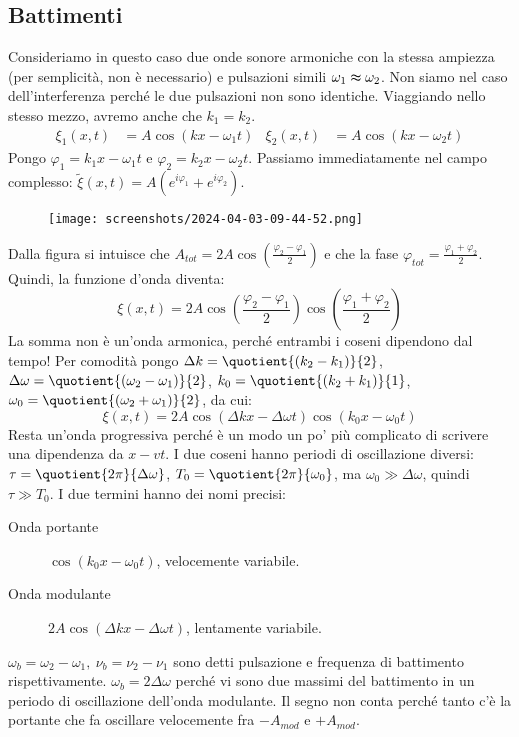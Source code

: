 \subsection{Battimenti}
Consideriamo in questo caso due onde sonore armoniche con la stessa ampiezza (per semplicità, non è necessario) e pulsazioni simili \(\omega _1 \thickapprox  \omega _2\). Non siamo nel caso dell'interferenza perché le due pulsazioni non sono identiche. Viaggiando nello stesso mezzo, avremo anche che \(k_1 = k_2\).
\begin{align}
	\xi _1 (x,t) &= A \cos (kx - \omega _1 t) & \xi _2 (x,t) &= A \cos (kx - \omega _2 t)
\end{align}
Pongo \(\varphi _1 = k_1 x - \omega_1 t\) e \(\varphi _2 = k_2 x - \omega _2 t\). Passiamo immediatamente nel campo complesso: \(\widetilde{\xi } (x,t) = A (e^{i \varphi _1} + e^{i \varphi _2}) \).
\begin{figure}[H]
	\centering
	\texttt{[image: screenshots/2024-04-03-09-44-52.png]}
\end{figure}
Dalla figura si intuisce che \(A_{tot} = 2A \cos \left( \frac{\varphi _2 - \varphi _1}{2} \right) \) e che la fase \(\varphi _{tot} = \frac{\varphi _1 + \varphi _2}{2} \). Quindi, la funzione d'onda diventa:
\[
	\xi (x,t) = 2A \cos \left( \frac{\varphi _2 - \varphi _1}{2} \right) \cos \left( \frac{\varphi _1 + \varphi _2}{2} \right) 
\]
La somma non è un'onda armonica, perché entrambi i coseni dipendono dal tempo! Per comodità pongo \(\Delta k = \quotient{(k_2 - k_1)}{2} \), \(\Delta \omega = \quotient{(\omega _2 - \omega _1)}{2} \), \(k_0 = \quotient{(k_2 + k_1)}{1} \), \(\omega _0 = \quotient{(\omega _2 + \omega _1 )}{2} \), da cui:
\[
	\xi (x,t) = 2A \cos (\Delta k x - \Delta \omega t) \cos (k_0 x - \omega _0 t)
\]
Resta un'onda progressiva perché è un modo un po' più complicato di scrivere una dipendenza da \(x-vt\). I due coseni hanno periodi di oscillazione diversi: \(\tau = \quotient{2\pi}{\Delta \omega } \), \(T_0 = \quotient{2 \pi }{\omega _0} \), ma \(\omega _0 \gg \Delta \omega \), quindi \(\tau \gg T_0\).
I due termini hanno dei nomi precisi:
\begin{description}
	\item[Onda portante] \(\cos (k_0 x - \omega _0 t)\), velocemente variabile.
	\item[Onda modulante] \(2A \cos (\Delta k x - \Delta \omega t)\), lentamente variabile.
\end{description}
\(\omega _b = \omega _2 - \omega _1,\ \nu _b = \nu _2 - \nu _1\) sono detti pulsazione e frequenza di battimento rispettivamente. \(\omega _b = 2 \Delta \omega \) perché vi sono due massimi del battimento in un periodo di oscillazione dell'onda modulante. Il segno non conta perché tanto c'è la portante che fa oscillare velocemente fra \(-A_{mod} \) e \(+A_{mod} \).
